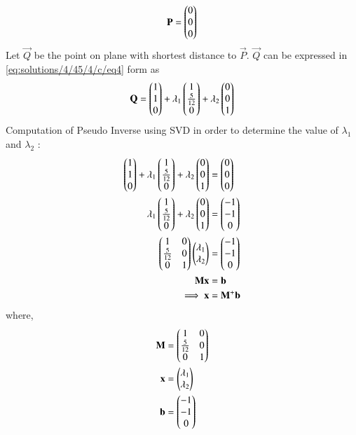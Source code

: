 \begin{equation}\label{eq:solutions/4/45/4/c/eq5}
	\mathbf{P} = \begin{pmatrix}0\\0\\0\end{pmatrix}
\end{equation}
Let $\vec{Q}$ be the point on plane with shortest distance to $\vec{P}$.
$\vec{Q}$ can be expressed in \eqref{eq:solutions/4/45/4/c/eq4} form as
\begin{align}\label{eq:solutions/4/45/4/c/eq6}
	\mathbf{Q} = \begin{pmatrix}1\\1\\0\end{pmatrix} + \lambda_1\begin{pmatrix}1\\\frac{5}{12}\\0\end{pmatrix} + \lambda_2\begin{pmatrix}0\\0\\1\end{pmatrix}
\end{align}
Computation of Pseudo Inverse using SVD in order to determine the value of $\lambda_1$ and $\lambda_2$ :
\begin{align}
	\label{eq:solutions/4/45/4/c/eq7}\begin{pmatrix}1\\1\\0\end{pmatrix} + \lambda_1\begin{pmatrix}1\\\frac{5}{12}\\0\end{pmatrix} + \lambda_2\begin{pmatrix}0\\0\\1\end{pmatrix} &= \begin{pmatrix}0\\0\\0\end{pmatrix}\\\label{eq:solutions/4/45/4/c/eq8}
	\lambda_1\begin{pmatrix}1\\\frac{5}{12}\\0\end{pmatrix} + \lambda_2\begin{pmatrix}0\\0\\1\end{pmatrix} &= \begin{pmatrix}-1\\-1\\0\end{pmatrix}\\\label{eq:solutions/4/45/4/c/eq9}
	\begin{pmatrix}1 & 0\\\frac{5}{12} & 0\\0 & 1\end{pmatrix} \begin{pmatrix}\lambda_1 \\ \lambda_2\end{pmatrix} &=\begin{pmatrix}-1\\-1\\0\end{pmatrix}\\\label{eq:solutions/4/45/4/c/eq10}
	\mathbf{M}\mathbf{x} &= \mathbf{b}\\\label{eq:solutions/4/45/4/c/eq11} 
	\implies\mathbf{x} &= \mathbf{M}^{+}\mathbf{b}
\end{align}
where,
\begin{align}
    \mathbf{M} &= \begin{pmatrix}1 & 0\\\frac{5}{12} & 0\\0 & 1\end{pmatrix} \\
    \mathbf{x} &= \begin{pmatrix}\lambda_1 \\ \lambda_2\end{pmatrix} \\
    \mathbf{b} &= \begin{pmatrix}-1\\-1\\0\end{pmatrix}
\end{align}
